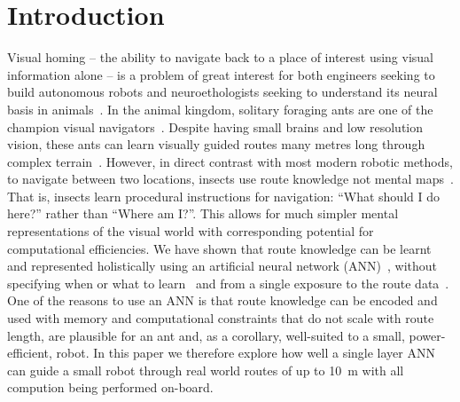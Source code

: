 \documentclass[letterpaper]{article}
\begin{document}
\section{Introduction}
Visual homing -- the ability to navigate back to a place of interest using visual information alone -- is a problem of great interest for both engineers seeking to build autonomous robots and neuroethologists seeking to understand its neural basis in animals~\citep{Graham2014}.
In the animal kingdom, solitary foraging ants are one of the champion visual navigators~\citep{Wehner2009}.
Despite having small brains and low resolution vision, these ants can learn visually guided routes many metres long through complex terrain~\citep{Knaden2016}.
However, in direct contrast with most modern robotic methods, to navigate between two locations, insects use route knowledge not mental maps~\citep{Wehner2006}. 
That is, insects learn procedural instructions for navigation: ``What should I do here?'' rather than ``Where am I?''. 
This allows for much simpler mental representations of the visual world with corresponding potential for computational efficiencies.
We have shown that route knowledge can be learnt and represented holistically using an artificial neural network (ANN)~\citep{Philippides2015}, without specifying when or what to learn~\citep{Baddeley2011} and from a single exposure to the route data~\citep{Baddeley2012}. 
One of the reasons to use an ANN is that route knowledge can be encoded and used with memory and computational constraints that do not scale with route length, are plausible for an ant and, as a corollary, well-suited to a small, power-efficient, robot. 
In this paper we therefore explore how well a single layer ANN can guide a small robot through real world routes of up to \SI{10}{\metre} with all compution being performed on-board.
\end{document}
